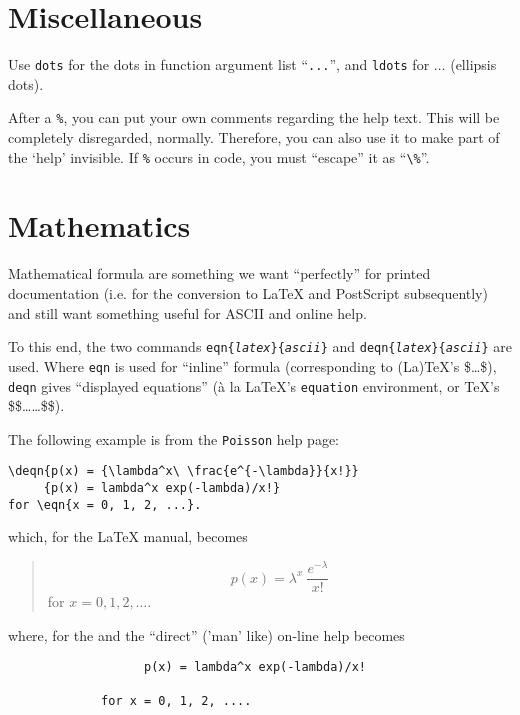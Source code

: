 \section{Miscellaneous}
Use \texttt{\BS{}dots} for the dots in function argument list
``\texttt{...}'', and \texttt{\BS{}ldots} for $\ldots$ (ellipsis dots).

After a \texttt{\%}, you can put your own comments regarding the help
text. This will be completely disregarded, normally. Therefore, you can
also use it to make part of the `help' invisible.  If \texttt{\%} occurs
in \R{} code, you must ``escape'' it as ``\verb|\%|''.

\section{Mathematics}
Mathematical formula are something we want ``perfectly'' for printed
documentation (i.e. for the conversion to \LaTeX{} and PostScript
subsequently) and still want something useful for ASCII and \HTML{} 
online help.

To this end, the two commands
\texttt{\BS{}eqn\{\textit{latex}\}\{\textit{ascii}\}} and
\texttt{\BS{}deqn\{\textit{latex}\}\{\textit{ascii}\}} are used. 
Where \texttt{\BS{}eqn} is used for ``inline'' formula (corresponding to
(La)\TeX's \$\ldots\$),
 \texttt{\BS{}deqn} gives ``displayed equations'' ({\`a} la \LaTeX's
 \texttt{equation} environment, or \TeX's \$\$\ldots\ldots\$\$).

\noindent The following example is from the \texttt{Poisson} help page:
\begin{display}
\begin{verbatim}
\deqn{p(x) = {\lambda^x\ \frac{e^{-\lambda}}{x!}}
     {p(x) = lambda^x exp(-lambda)/x!}
for \eqn{x = 0, 1, 2, ...}.
\end{verbatim}
\end{display}
which, for the \LaTeX{} manual, becomes
\begin{quote}
  \[ p(x) = \lambda^x\ \frac{e^{-\lambda}}{x!}  \]
  for $ x = 0, 1, 2, \ldots $.
\end{quote}
where, for the \HTML{} and the ``direct'' ('man' like) on-line help
becomes
\begin{verbatim}
                   p(x) = lambda^x exp(-lambda)/x!
        
             for x = 0, 1, 2, ....
\end{verbatim}
        
